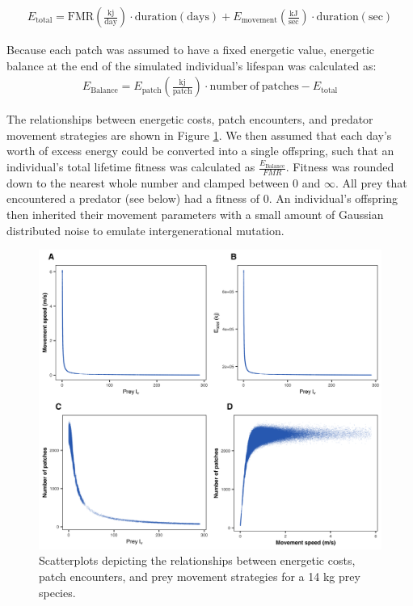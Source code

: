 \documentclass[12pt]{article}
\begin{document}
\begin{gather}
E_{\mathrm{total}} = \mathrm{FMR (\frac{kj}{day}) \cdot duration (days)} + E_{\mathrm{movement}} \mathrm{(\frac{kJ}{sec}) \cdot duration (sec)}
\end{gather}

Because each patch was assumed to have a fixed energetic value, energetic balance at the end of the simulated individual's lifespan was calculated as:
\begin{gather}
E_{\mathrm{Balance}} = E_{\mathrm{patch}} \mathrm{(\frac{kj}{patch})} \cdot \mathrm{number~of~patches} - E_{\mathrm{total}}
\end{gather}

The relationships between energetic costs, patch encounters, and predator movement strategies are shown in Figure \ref{fig:Prey_Diagnostics}.  We then assumed that each day’s worth of excess energy could be converted into a single offspring, such that an individual's total lifetime fitness was calculated as $\frac{E_{\mathrm{Balance}}}{FMR}$. Fitness was rounded down to the nearest whole number and clamped between 0 and $\infty$. All prey that encountered a predator (see below) had a fitness of 0. An individual's offspring then inherited their movement parameters with a small amount of Gaussian distributed noise to emulate intergenerational mutation.

\begin{figure}[!h]
\centering
\includegraphics[scale=1]{Prey_Diagnostics.png}
\caption{Scatterplots depicting the relationships between energetic costs, patch encounters, and prey movement strategies for a 14 kg prey species.}
\label{fig:Prey_Diagnostics}
\end{figure}
\end{document}
